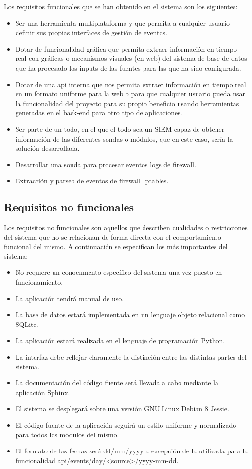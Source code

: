Los requisitos funcionales que se han obtenido en el sistema son los siguientes:

\begin{itemize}
\item Ser una herramienta multiplataforma y que permita a cualquier usuario definir sus propias interfaces de gestión de eventos.
\item Dotar de funcionalidad gráfica que permita extraer información en tiempo real con gráficas o mecanismos visuales (en web) del sistema de base de datos que ha procesado los inputs de las fuentes para las que ha sido configurada.
\item Dotar de una api interna que nos permita extraer información en tiempo real en un formato uniforme para la web o para que cualquier usuario pueda usar la funcionalidad del proyecto para su propio beneficio usando herramientas generadas en el back-end para otro tipo de aplicaciones.
\item Ser parte de un todo, en el que el todo sea un SIEM capaz de obtener información de las diferentes sondas o módulos, que en este caso, sería la solución desarrollada.
\item Desarrollar una sonda para procesar eventos logs de firewall.
\item Extracción y parseo de eventos de firewall Iptables.
\end{itemize}

\subsection{Requisitos no funcionales}

Los requisitos no funcionales son aquellos que describen cualidades o restricciones del sistema que no se relacionan de forma directa con el comportamiento funcional del mismo. A continuación se especifican los más importantes del sistema:
\begin{itemize}
\item No requiere un conocimiento específico del sistema una vez puesto en funcionamiento.
\item La aplicación tendrá manual de uso.
\item La base de datos estará implementada en un lenguaje objeto relacional como SQLite.
\item La aplicación estará realizada en el lenguaje de programación Python.
\item La interfaz debe reflejar claramente la distinción entre las distintas partes del sistema.
\item La documentación del código fuente será llevada a cabo mediante la aplicación Sphinx.
\item El sistema se desplegará sobre una versión GNU Linux Debian 8 Jessie.
\item El código fuente de la aplicación seguirá un estilo uniforme y normalizado para todos los módulos del mismo.
\item El formato de las fechas será dd/mm/yyyy a excepción de la utilizada para la funcionalidad api/events/day/<source>/yyyy-mm-dd.
\end{itemize}
